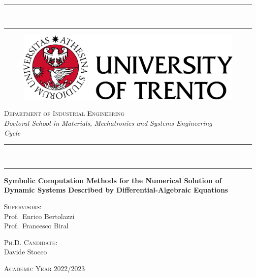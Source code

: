 
\begin{titlepage}
%
\setlength\parindent{0pt}
\setlength{\topmargin}{-20mm}
\setlength{\voffset}{0mm}
%
\begin{center}
  \rule[0.1cm]{\textwidth}{0.6mm} \\ %
  \rule[0.5cm]{\textwidth}{0.3mm}
\end{center}
%
\vspace{-10mm}
%
\begin{figure}[htb]
  \centering
  \includegraphics[scale=0.5]{./figures/frontmatter/logo.png}
\end{figure}
%
\begin{center}
  \Large{\textsc{Department of Industrial Engineering}} \\
  \vspace{2mm}
  \large{\textsl{Doctoral School in Materials, Mechatronics and Systems Engineering}} \\
  \vspace{2mm}
  \large{ \textsl{Cycle}}
\end{center}
%
\begin{center}
  \rule[0.1cm]{\textwidth}{0.3mm} \\ %
  \rule[0.5cm]{\textwidth}{0.6mm}
\end{center}
%
\vfill
%
\begin{center}
  \huge{\textbf{Symbolic Computation Methods for the Numerical Solution of Dynamic Systems Described by Differential-Algebraic Equations}} \\
\end{center}
%
\vfill
%
\begin{minipage}[t]{0.49\textwidth}
  \Large{\textsc{Supervisors:}} \\
  Prof.~Enrico Bertolazzi \\[0.05em]
  Prof.~Francesco Biral
\end{minipage}
\hfill
\begin{minipage}[t]{0.49\textwidth}\raggedleft
  \Large{\textsc{Ph.D. Candidate:}} \\
  Davide Stocco
  \vspace{5mm}
\end{minipage}
%
\vfill
%
\begin{center}
  \large{\textsc{Academic Year 2022/2023}}
\end{center}

\end{titlepage}